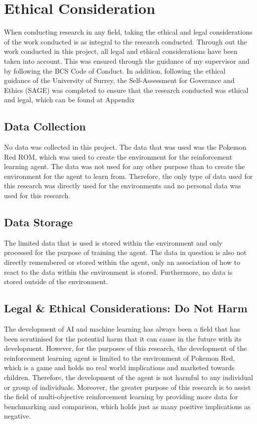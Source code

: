 \section{Ethical Consideration}

When conducting research in any field, taking the ethical and legal considerations of the work conducted is as integral to the research conducted. Through out the work conducted in this project, all legal and ethical considerations have been taken into account. This was ensured through the guidance of my supervisor and by following the BCS Code of Conduct. In addition, following the ethical guidance of the University of Surrey, the Self-Assessment for Goverance and Ethics (SAGE) was completed to ensure that the research conducted was ethical and legal, which can be found at Appendix %

\subsection{Data Collection}

No data was collected in this project. The data that was used was the Pokemon Red ROM, which was used to create the environment for the reinforcement learning agent. The data was not used for any other purpose than to create the environment for the agent to learn from. Therefore, the only type of data used for this research was directly used for the environments and no personal data was used for this research.

\subsection{Data Storage}

The limited data that is used is stored within the environment and only processed for the purpose of training the agent. The data in question is also not directly remembered or stored within the agent, only an association of how to react to the data within the environment is stored. Furthermore, no data is stored outside of the environment. 

\subsection{Legal \& Ethical Considerations: Do Not Harm}

The development of AI and machine learning has always been a field that has been scrutinised for the potential harm that it can cause in the future with its development. However, for the purposes of this research, the development of the reinforcement learning agent is limited to the environment of Pokemon Red, which is a game and holds no real world implications and marketed towards children. Therefore, the development of the agent is not harmful to any individual or group of individuals. Moreover, the greater purpose of this research is to assist the field of multi-objective reinforcement learning by providing more data for benchmarking and comparison, which holds just as many positive implications as negative.

